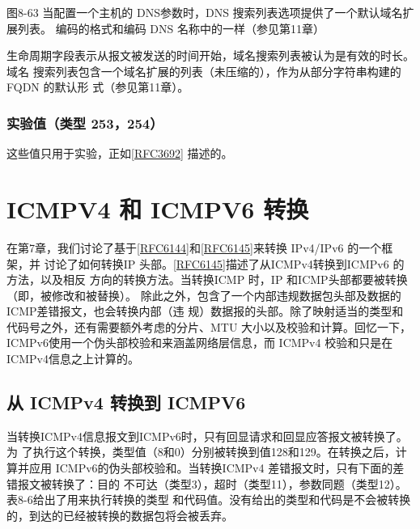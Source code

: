 图8-63 当配置一个主机的 DNS参数时，DNS 搜索列表选项提供了一个默认域名扩展列表。
编码的格式和编码 DNS 名称中的一样（参见第11章）

生命周期字段表示从报文被发送的时间开始，域名搜索列表被认为是有效的时长。域名
搜索列表包含一个域名扩展的列表（未压缩的），作为从部分字符串构建的FQDN 的默认形
式（参见第11章）。

\subsubsection{实验值（类型 253，254）}
这些值只用于实验，正如\href{https://www.rfc-editor.org/rfc/rfc3692}{[RFC3692]} 描述的。

\section{ICMPV4 和 ICMPV6 转换}
在第7章，我们讨论了基于\href{https://www.rfc-editor.org/rfc/rfc6144}{[RFC6144]}和\href{https://www.rfc-editor.org/rfc/rfc6145}{[RFC6145]}来转换
IPv4/IPv6 的一个框架，并
讨论了如何转换IP
头部。\href{https://www.rfc-editor.org/rfc/rfc6145}{[RFC6145]}描述了从ICMPv4转换到ICMPv6
的方法，以及相反
方向的转换方法。当转换ICMP 时，IP 和ICMP头部都要被转换（即，被修改和被替换）。
除此之外，包含了一个内部违规数据包头部及数据的ICMP差错报文，也会转换内部（违
规）数据报的头部。除了映射适当的类型和代码号之外，还有需要额外考虑的分片、MTU
大小以及校验和计算。回忆一下，ICMPv6使用一个伪头部校验和来涵盖网络层信息，而
ICMPv4 校验和只是在ICMPv4信息之上计算的。

\subsection{从 ICMPv4 转换到 ICMPV6}
当转换ICMPv4信息报文到ICMPv6时，只有回显请求和回显应答报文被转换了。为
了执行这个转换，类型值（8和0）分别被转换到值128和129。在转换之后，计算并应用
ICMPv6的伪头部校验和。当转换ICMPv4 差错报文时，只有下面的差错报文被转换了：目的
不可达（类型3），超时（类型11），参数同题（类型12）。表8-6给出了用来执行转换的类型
和代码值。没有给出的类型和代码是不会被转换的，到达的已经被转换的数据包将会被丢弃。

